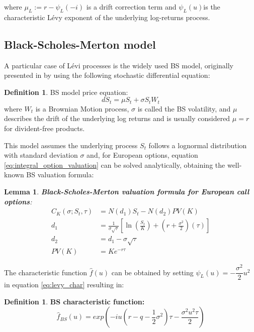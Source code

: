 \documentclass[12,twoside]{mammeTFM}
\newtheorem{lem}[thm]{Lemma}
\theoremstyle{definition}
\newtheorem{definition}[thm]{Definition}
\theoremstyle{remark}
\begin{document}
where $\mu_L:= r - \psi_L(-i)$ is a drift correction term and $\psi_L(u)$is the characteristic L\'evy exponent of the underlying log-returns process.

\subsection{Black-Scholes-Merton model} \label{subsec:bs}

A particular case of L\'evi processes is the widely used BS model, originally presented in \cite{bs73} by using the following stochastic differential equation:
\begin{definition} BS model price equation:
\begin{equation}
dS_t = \mu S_t + \sigma S_t W_t
\end{equation}
where $W_t$ is a Brownian Motion process, $\sigma$ is called the BS volatility, and $\mu$ describes the drift of the underlying log returns and is usually considered $\mu = r$ for divident-free products.
\end{definition}

This model assumes the underlying process $S_t$ follows a lognormal distribution with standard deviation $\sigma$ and, for European options, equation \ref{eq:integral_option_valuation} can be solved analytically, obtaining the well-known BS valuation formula:

\begin{lem} \textbf{Black-Scholes-Merton valuation formula for European call options}:
\begin{align}
  C_K(\sigma; S_t, \tau) &= N(d_1)S_t - N(d_2) PV(K) \\
     d_1 &= \frac{1}{\sigma\sqrt{\tau}}\left[\ln\left(\frac{S_t}{K}\right) + \left(r + \frac{\sigma^2}{2}\right)(\tau)\right] \\
     d_2 &= d_1 - \sigma\sqrt{\tau} \\
PV(K) &=Ke^{-r\tau}
\end{align}
\end{lem}

The characteristic function $\hat{f}(u)$ can be obtained by setting $\psi_L (u) = -\dfrac{\sigma^2}{2}u^2$ in equation \ref{eq:levy_char} resulting in:
\begin{definition} \textbf{BS characteristic function:}
\begin{equation}
\hat{f}_{BS}(u) = exp{\left(-iu \left( r-q - \dfrac{1}{2}\sigma^2 \right) \tau - \dfrac{\sigma^2 u^2 \tau}{2} \right)}
\end{equation}
\end{definition}
\end{document}
